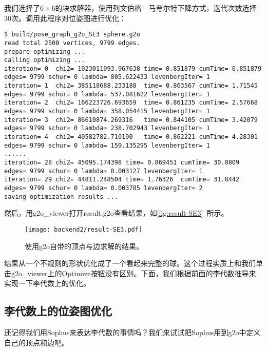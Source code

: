 我们选择了$6\times6$的块求解器，使用列文伯格—马夸尔特下降方式，迭代次数选择30次。调用此程序对位姿图进行优化：
\begin{lstlisting}
$ build/pose_graph_g2o_SE3 sphere.g2o 
read total 2500 vertices, 9799 edges.
prepare optimizing ...
calling optimizing ...
iteration= 0  chi2= 1023011093.967638 time= 0.851879 cumTime= 0.851879 edges= 9799 schur= 0 lambda= 805.622433 levenbergIter= 1
iteration= 1  chi2= 385118688.233188  time= 0.863567 cumTime= 1.71545  edges= 9799 schur= 0 lambda= 537.081622 levenbergIter= 1
iteration= 2  chi2= 166223726.693659  time= 0.861235 cumTime= 2.57668  edges= 9799 schur= 0 lambda= 358.054415 levenbergIter= 1
iteration= 3  chi2= 86610874.269316   time= 0.844105 cumTime= 3.42079  edges= 9799 schur= 0 lambda= 238.702943 levenbergIter= 1
iteration= 4  chi2= 40582782.710190   time= 0.862221 cumTime= 4.28301  edges= 9799 schur= 0 lambda= 159.135295 levenbergIter= 1
......
iteration= 28 chi2= 45095.174398 time= 0.869451 cumTime= 30.0809 edges= 9799 schur= 0 lambda= 0.003127 levenbergIter= 1
iteration= 29 chi2= 44811.248504 time= 1.76326  cumTime= 31.8442 edges= 9799 schur= 0 lambda= 0.003785 levenbergIter= 2
saving optimization results ...
\end{lstlisting}

然后，用g2o\_viewer打开result.g2o查看结果，如\autoref{fig:result-SE3}~所示。
\begin{figure}[!ht]
	\centering
	\texttt{[image: backend2/result-SE3.pdf]}
	\caption{使用g2o自带的顶点与边求解的结果。}
	\label{fig:result-SE3}
\end{figure}

结果从一个不规则的形状优化成了一个看起来完整的球。这个过程实质上和我们单击g2o\_viewer上的Optimize按钮没有区别。下面，我们根据前面的李代数推导来实现一下李代数上的优化。

\subsection{李代数上的位姿图优化}
还记得我们用Sophus来表达李代数的事情吗？我们来试试把Sophus用到g2o中定义自己的顶点和边吧。

